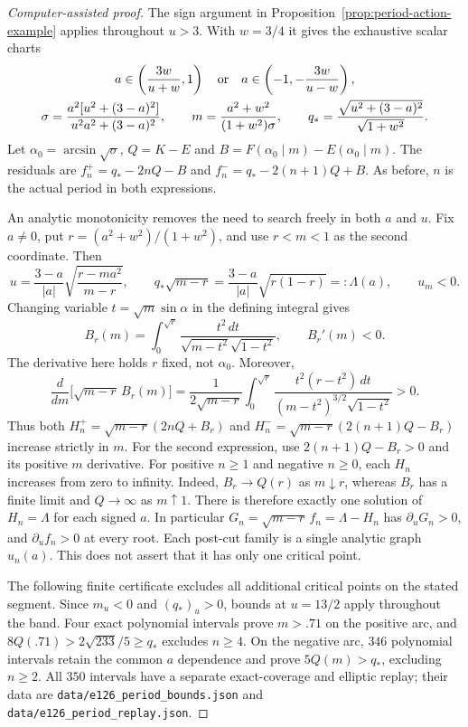 \documentclass[11pt,a4paper]{article}
\theoremstyle{remark}\newtheorem{remark}[theorem]{Remark}
\begin{document}
\begin{proof}[Computer-assisted proof]
The sign argument in Proposition~\ref{prop:period-action-example}
applies throughout $u>3$. With $w=3/4$ it gives the exhaustive scalar charts
\begin{equation}\label{eq:line-source-arcs}
 \begin{gathered}
 a\in\left(\frac{3w}{u+w},1\right)
 \quad\hbox{or}\quad
 a\in\left(-1,-\frac{3w}{u-w}\right),\\
 \sigma=\frac{a^2[u^2+(3-a)^2]}{u^2a^2+(3-a)^2},\qquad
 m=\frac{a^2+w^2}{(1+w^2)\sigma},\qquad
 q_* =\frac{\sqrt{u^2+(3-a)^2}}{\sqrt{1+w^2}}.
 \end{gathered}
\end{equation}
Let $\alpha_0=\arcsin\sqrt\sigma$, $Q=K-E$ and
$B=F(\alpha_0\mid m)-E(\alpha_0\mid m)$. The residuals are
$f_n^+=q_*-2nQ-B$ and $f_n^-=q_*-2(n+1)Q+B$.
As before, $n$ is the actual period in both expressions.

An analytic monotonicity removes the need to search freely in both
$a$ and $u$. Fix $a\ne0$, put $r=(a^2+w^2)/(1+w^2)$, and use
$r<m<1$ as the second coordinate. Then
\[
 u=\frac{3-a}{|a|}\sqrt{\frac{r-ma^2}{m-r}},\qquad
 q_*\sqrt{m-r}=\frac{3-a}{|a|}\sqrt{r(1-r)}=:\Lambda(a),
 \qquad u_m<0.
\]
Changing variable $t=\sqrt m\sin\alpha$ in the defining integral gives
\[
 B_r(m)=\int_0^{\sqrt r}
 \frac{t^2\,dt}{\sqrt{m-t^2}\sqrt{1-t^2}},\qquad B_r'(m)<0.
\]
The derivative here holds $r$ fixed, not $\alpha_0$. Moreover,
\begin{equation}\label{eq:weighted-drift-monotonicity}
 \frac{d}{dm}\bigl[\sqrt{m-r}\,B_r(m)\bigr]
 =\frac{1}{2\sqrt{m-r}}\int_0^{\sqrt r}
 \frac{t^2(r-t^2)\,dt}{(m-t^2)^{3/2}\sqrt{1-t^2}}>0.
\end{equation}
Thus both
$H_n^+=\sqrt{m-r}(2nQ+B_r)$ and
$H_n^-=\sqrt{m-r}(2(n+1)Q-B_r)$ increase strictly in $m$.
For the second expression, use $2(n+1)Q-B_r>0$ and its positive
$m$ derivative. For positive $n\ge1$ and negative $n\ge0$, each $H_n$
increases from zero to infinity. Indeed, $B_r\to Q(r)$ as $m\downarrow r$,
whereas $B_r$ has a finite limit and $Q\to\infty$ as $m\uparrow1$.
There is therefore exactly one solution of $H_n=\Lambda$ for each signed
$a$. In particular $G_n=\sqrt{m-r}\,f_n=\Lambda-H_n$ has
$\partial_uG_n>0$, and $\partial_uf_n>0$ at every root. Each post-cut
family is a single analytic graph $u_n(a)$. This does not assert that it
has only one critical point.

The following finite certificate excludes all additional critical points
on the stated segment. Since $m_u<0$ and $(q_*)_u>0$, bounds at $u=13/2$
apply throughout the band. Four exact polynomial intervals prove $m>.71$
on the positive arc, and
$8Q(.71)>2\sqrt{233}/5\ge q_*$ excludes $n\ge4$.
On the negative arc, $346$ polynomial intervals retain the common
$a$ dependence and prove $5Q(m)>q_*$, excluding $n\ge2$.
All $350$ intervals have a separate exact-coverage and elliptic replay;
their data are \nolinkurl{data/e126_period_bounds.json} and
\nolinkurl{data/e126_period_replay.json}.


\end{proof}
\end{document}
